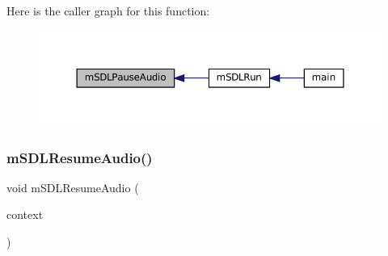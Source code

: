 Here is the caller graph for this function\+:
\nopagebreak
\begin{figure}[H]
\begin{center}
\leavevmode
\includegraphics[width=350pt]{sdl-audio_8c_a6fd4770ab1d4825f5f3231ce155d4696_icgraph}
\end{center}
\end{figure}
\mbox{\label{sdl-audio_8c_aec2e6fbd9b73db60bf1dee6113caeb03}} 
\subsubsection{\texorpdfstring{m\+S\+D\+L\+Resume\+Audio()}{mSDLResumeAudio()}}
{\footnotesize\ttfamily void m\+S\+D\+L\+Resume\+Audio (\begin{DoxyParamCaption}\item[{struct \mbox{\hyperlink{sdl-audio_8h_structm_s_d_l_audio}{m\+S\+D\+L\+Audio}} $\ast$}]{context }\end{DoxyParamCaption})}

